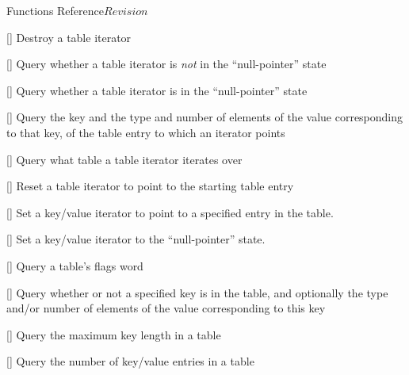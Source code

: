 \begin{cactuspart}{ Functions Reference}{}{$Revision$}
\begin{Lentry}
\item[\code{Util\_TableItDestroy}]
     [\pageref{Util-TableItDestroy}]
Destroy a table iterator

\item[\code{Util\_TableItQueryIsNonNull}]
     [\pageref{Util-TableItQueryIsNonNull}]
Query whether a table iterator is {\em not\/} in the ``null-pointer'' state

\item[\code{Util\_TableItQueryIsNull}]
     [\pageref{Util-TableItQueryIsNull}]
Query whether a table iterator is in the ``null-pointer'' state

\item[\code{Util\_TableItQueryKeyValueInfo}]
     [\pageref{Util-TableItQueryKeyValueInfo}]
Query the key and the type and number of elements of the value
corresponding to that key, of the table entry to which an iterator points

\item[\code{Util\_TableItQueryTableHandle}]
     [\pageref{Util-TableItQueryTableHandle}]
Query what table a table iterator iterates over

\item[\code{Util\_TableItResetToStart}]
     [\pageref{Util-TableItResetToStart}]
Reset a table iterator to point to the starting table entry

\item[\code{Util\_TableItSetToKey}]
     [\pageref{Util-TableItSetToKey}]
Set a key/value iterator to point to a specified entry in the table.

\item[\code{Util\_TableItSetToNull}]
     [\pageref{Util-TableItSetToNull}]
Set a key/value iterator to the ``null-pointer'' state.

\item[\code{Util\_TableQueryFlags}]
     [\pageref{Util-TableQueryFlags}]
Query a table's flags word

\item[\code{Util\_TableQueryValueInfo}]
     [\pageref{Util-TableQueryValueInfo}]
Query whether or not a specified key is in the table, and optionally
the type and/or number of elements of the value corresponding to this key

\item[\code{Util\_TableQueryMaxKeyLength}]
     [\pageref{Util-TableQueryMaxKeyLength}]
Query the maximum key length in a table

\item[\code{Util\_TableQueryNKeys}]
     [\pageref{Util-TableQueryNKeys}]
Query the number of key/value entries in a table


\end{Lentry}
\end{cactuspart}
